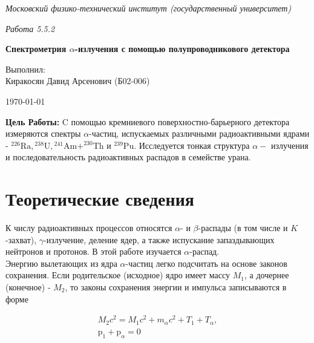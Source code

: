 \documentclass[11.5pt,a4paper,russian]{article}
\begin{document}
\begin{titlepage}

\begin{center}

\large \textit{\small Московский физико-технический институт (государственный университет)}

\vspace{5cm}
\textit{Работа 5.5.2}

\vspace{1cm}
\textbf{\huge Спектрометрия $\alpha$-излучения с помощью полупроводникового детектора}

\vspace{12cm}

\begin{flushright}
\parbox{0.45\textwidth}{
Выполнил: \\[0.5cm]
Киракосян Давид Арсенович (Б02-006) \\[0.2cm]
}
\end{flushright} 

\vfill

\today
\end{center}
\end{titlepage}

\textbf{Цель Работы:}  C помощью кремниевого поверхностно-барьерного детектора измеряются спектры $\alpha$-частиц, испускаемых различными радиоактивными ядрами - ${ }^{226} \mathrm{Ra},{ }^{238} \mathrm{U},{ }^{241} \mathrm{Am} + ^{230} \mathrm{Th}$ и ${ }^{239} \mathrm{Pu}$. Исследуется тонкая структура $\alpha-$ излучения и последовательность радиоактивных распадов в семействе урана.

\section{Теоретические сведения}
К числу радиоактивных процессов относятся $\alpha$- и $\beta$-распады (в том числе и $K$-захват), $\gamma$-излучение, деление ядер, а также испускание запаздывающих нейтронов и протонов. В этой работе изучается $\alpha$-распад.\\
Энергию вылетающих из ядра $\alpha$-частиц легко подсчитать на основе законов сохранения. Если родительское (исходное) ядро имеет массу $M_1$, а дочернее (конечное) - $M_2$, то законы сохранения энергии и импульса записываются в форме

$$
\begin{gathered}
M_2 c^2=M_1 c^2+m_\alpha c^2+T_1+T_\alpha, \\
\mathrm{p}_1+\mathrm{p}_\alpha=0
\end{gathered}
$$
\end{document}
